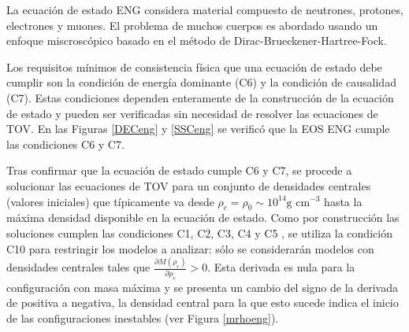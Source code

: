 \noindent La ecuación de estado ENG considera material compuesto de neutrones, protones, electrones y muones. El problema de muchos cuerpos es abordado usando un enfoque miscroscópico basado en el método de Dirac-Brueckener-Hartree-Fock.  

Los requisitos mínimos de consistencia física que una ecuación de estado debe cumplir son la condición de energía dominante (C6) y la condición de causalidad (C7). Estas condiciones dependen enteramente de la construcción de la ecuación de estado y pueden ser verificadas sin necesidad de resolver las ecuaciones de TOV. En las Figuras \ref{DECeng} y \ref{SSCeng} se verificó que la EOS ENG cumple las condiciones C6 y C7.

Tras confirmar que la ecuación de estado cumple C6 y C7, se procede a solucionar las ecuaciones de TOV para un conjunto de densidades centrales (valores iniciales) que típicamente va desde $\rho_c=\rho_0 \sim 10^{14} \text{g cm}^{-3}$ hasta la máxima densidad disponible en la ecuación de estado. Como por construcción las soluciones cumplen las condiciones C1, C2, C3, C4 y C5 , se utiliza la condición C10 para restringir los modelos a analizar: sólo se considerarán modelos con densidades centrales tales que $\frac { \partial M \left( \rho _ { c } \right) } { \partial \rho _ { c } } > 0$. Esta derivada es nula para la configuración con masa máxima y se presenta un cambio del signo de la derivada de positiva a negativa, la densidad central para la que esto sucede indica el inicio de las configuraciones inestables (ver Figura \ref{mrhoeng}).

